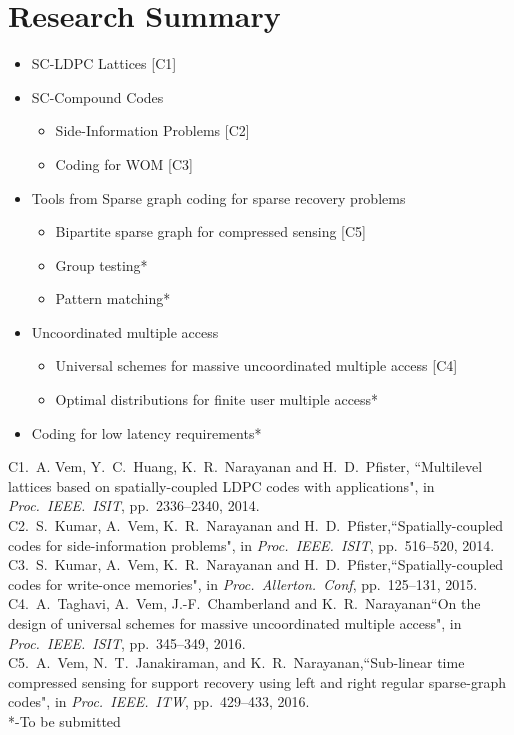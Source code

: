\documentclass[10pt]{beamer}
\begin{document}
\section{Research Summary}
\begin{frame}
\begin{itemize}
\item SC-LDPC Lattices [C1]
\item SC-Compound Codes
\begin{itemize}
\item Side-Information Problems [C2]
\item Coding for WOM [C3] 
\end{itemize}
\item Tools from Sparse graph coding for sparse recovery problems 
\begin{itemize}
\item Bipartite sparse graph for compressed sensing [C5]
\item Group testing*
\item Pattern matching*
\end{itemize}
\item Uncoordinated multiple access
\begin{itemize}
\item Universal schemes for massive uncoordinated multiple access [C4]
\item Optimal distributions for finite user multiple access*
\end{itemize}	
\item Coding for low latency requirements*
\end{itemize}
\vspace{2mm}
{\tiny
C1.~A. Vem, Y.~C.~Huang, K.~R.~Narayanan and H.~D.~Pfister, ``Multilevel lattices based on spatially-coupled LDPC codes with applications", in \textit{Proc.~IEEE.~ISIT}, pp.~2336--2340, 2014.\\
C2.~S.~Kumar, A.~Vem, K.~R.~Narayanan and H.~D.~Pfister,``Spatially-coupled codes for side-information problems",
in \textit{Proc.~IEEE.~ISIT}, pp.~516--520, 2014.\\
C3.~S.~Kumar, A.~Vem, K.~R.~Narayanan and H.~D.~Pfister,``Spatially-coupled codes for write-once memories",
in \textit{Proc.~Allerton.~Conf}, pp.~125--131, 2015.\\
C4.~A.~Taghavi, A.~Vem, J.-F.~Chamberland and K.~R.~Narayanan``On the design of universal schemes for massive uncoordinated multiple access", in \textit{Proc.~IEEE.~ISIT}, pp.~345--349, 2016. \\
C5.~A.~Vem, N.~T.~Janakiraman, and K.~R.~Narayanan,``Sub-linear time compressed sensing for support recovery using left and right regular sparse-graph codes", in \textit{Proc.~IEEE.~ITW}, pp.~429--433, 2016.\\
*-To be submitted
}
\end{frame}
\end{document}
